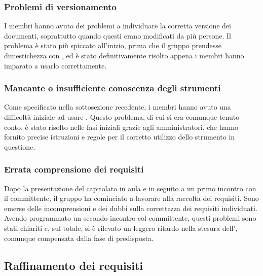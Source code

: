 \documentclass[a4paper, titlepage]{article}
\begin{document}
		\subsubsection{Problemi di versionamento}
		I membri hanno avuto dei problemi a individuare la corretta versione dei documenti, soprattutto quando questi erano modificati da più persone. Il problema è stato più spiccato all'inizio, prima che il gruppo prendesse dimestichezza con , ed è stato definitivamente risolto appena i membri hanno imparato a usarlo correttamente.
		
		\subsubsection{Mancante o insufficiente conoscenza degli strumenti}
		Come specificato nella sottosezione recedente, i membri hanno avuto una difficoltà iniziale ad usare . Questo problema, di cui si era comunque tenuto conto, è stato risolto nelle fasi iniziali grazie agli amministratori, che hanno fornito precise istruzioni e regole per il corretto utilizzo dello strumento in questione.
		
		\subsubsection{Errata comprensione dei requisiti}
		Dopo la presentazione del capitolato in aula e in seguito a un primo incontro con il committente, il gruppo ha cominciato a lavorare alla raccolta dei requisiti. Sono emerse delle incomprensioni e dei dubbi sulla correttezza dei requisiti individuati. Avendo programmato un secondo incontro col committente, questi problemi sono stati chiariti e, sul totale, si è rilevato un leggero ritardo nella stesura dell', comunque compensata dalla fase di  predisposta.
		
		\subsection{Raffinamento dei requisiti}
		
\end{document}
